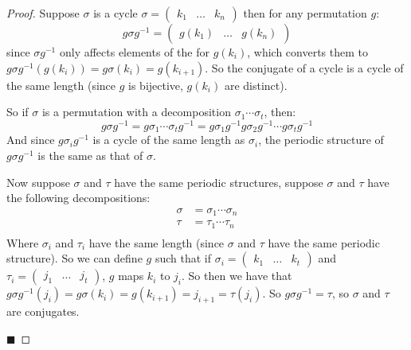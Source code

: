 \documentclass[10pt]{article}
\def\pmat#1{\begin{pmatrix} #1 \end{pmatrix}}
\begin{document}
\begin{proof}

    Suppose $\sigma$ is a cycle $\sigma=\pmat{k_1&\ldots&k_n}$ then for any permutation $g$:
    \[ g\sigma g^{-1} = \pmat{g(k_1)&\ldots&g(k_n)} \]
    since $\sigma g^{-1}$ only affects elements of the for $g(k_i)$, which converts them to $g\sigma g^{-1}(g(k_i))=g\sigma(k_i)=g(k_{i+1})$.
    So the conjugate of a cycle is a cycle of the same length (since $g$ is bijective, $g(k_i)$ are distinct).

    So if $\sigma$ is a permutation with a decomposition $\sigma_1\cdots\sigma_t$, then:
    \[ g\sigma g^{-1} = g\sigma_1\cdots\sigma_t g^{-1} = g\sigma_1 g^{-1} g\sigma_2 g^{-1}\cdots g\sigma_t g^{-1} \]
    And since $g\sigma_i g^{-1}$ is a cycle of the same length as $\sigma_i$, the periodic structure of $g\sigma g^{-1}$ is the same as that of $\sigma$.

    Now suppose $\sigma$ and $\tau$ have the same periodic structures, suppose $\sigma$ and $\tau$ have the following decompositions:
    \begin{align*}
        \sigma &= \sigma_1\cdots\sigma_n \\
        \tau &= \tau_1\cdots\tau_n \\
    \end{align*}
    Where $\sigma_i$ and $\tau_i$ have the same length (since $\sigma$ and $\tau$ have the same periodic structure).
    So we can define $g$ such that if $\sigma_i=\pmat{k_1&\ldots&k_t}$ and $\tau_i=\pmat{j_1&\ldots&j_t}$, $g$ maps $k_i$ to $j_i$.
    So then we have that $g\sigma g^{-1}(j_i) = g\sigma(k_i)=g(k_{i+1})=j_{i+1}=\tau(j_i)$.
    So $g\sigma g^{-1}=\tau$, so $\sigma$ and $\tau$ are conjugates.

    \hfill$\blacksquare$

\end{proof}
\end{document}
